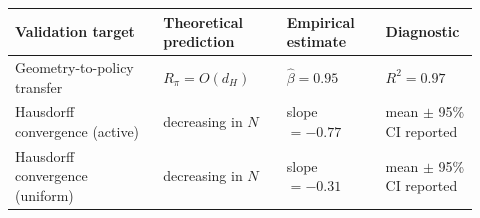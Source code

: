 \begin{tabular}{p{0.30\linewidth}p{0.25\linewidth}p{0.20\linewidth}p{0.17\linewidth}}
\toprule
Validation target & Theoretical prediction & Empirical estimate & Diagnostic \\
\midrule
Geometry-to-policy transfer & $R_\pi = O(d_H)$ & $\widehat{\beta}=0.95$ & $R^2=0.97$ \\
Hausdorff convergence (active) & decreasing in $N$ & slope $=-0.77$ & mean $\pm$ 95\% CI reported \\
Hausdorff convergence (uniform) & decreasing in $N$ & slope $=-0.31$ & mean $\pm$ 95\% CI reported \\
\bottomrule
\end{tabular}
